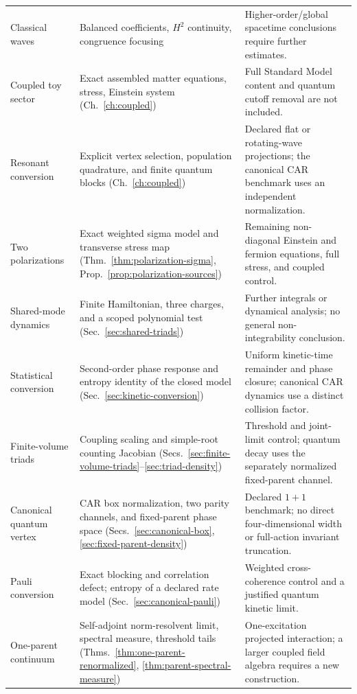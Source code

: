 \documentclass[11pt,a4paper,oneside]{book}
\theoremstyle{plain}
\theoremstyle{definition}
\theoremstyle{remark}
\begin{document}
\begin{longtable}{@{}>{\raggedright\arraybackslash}p{}>{\raggedright\arraybackslash}p{}>{\raggedright\arraybackslash}p{}@{}}
Classical waves & Balanced coefficients, $H^2$ continuity, congruence focusing & Higher-order/global spacetime conclusions require further estimates.\\[1pt]
Coupled toy sector & Exact assembled matter equations, stress, Einstein system (Ch.~\ref{ch:coupled}) & Full Standard Model content and quantum cutoff removal are not included.\\[1pt]
Resonant conversion & Explicit vertex selection, population quadrature, and finite quantum blocks (Ch.~\ref{ch:coupled}) & Declared flat or rotating-wave projections; the canonical CAR benchmark uses an independent normalization.\\[1pt]
Two polarizations & Exact weighted sigma model and transverse stress map (Thm.~\ref{thm:polarization-sigma}, Prop.~\ref{prop:polarization-sources}) & Remaining non-diagonal Einstein and fermion equations, full stress, and coupled control.\\[1pt]
Shared-mode dynamics & Finite Hamiltonian, three charges, and a scoped polynomial test (Sec.~\ref{sec:shared-triads}) & Further integrals or dynamical analysis; no general non-integrability conclusion.\\[1pt]
Statistical conversion & Second-order phase response and entropy identity of the closed model (Sec.~\ref{sec:kinetic-conversion}) & Uniform kinetic-time remainder and phase closure; canonical CAR dynamics use a distinct collision factor.\\[1pt]
Finite-volume triads & Coupling scaling and simple-root counting Jacobian (Secs.~\ref{sec:finite-volume-triads}--\ref{sec:triad-density}) & Threshold and joint-limit control; quantum decay uses the separately normalized fixed-parent channel.\\[1pt]
Canonical quantum vertex & CAR box normalization, two parity channels, and fixed-parent phase space (Secs.~\ref{sec:canonical-box}, \ref{sec:fixed-parent-density}) & Declared $1+1$ benchmark; no direct four-dimensional width or full-action invariant truncation.\\[1pt]
Pauli conversion & Exact blocking and correlation defect; entropy of a declared rate model (Sec.~\ref{sec:canonical-pauli}) & Weighted cross-coherence control and a justified quantum kinetic limit.\\[1pt]
One-parent continuum & Self-adjoint norm-resolvent limit, spectral measure, threshold tails (Thms.~\ref{thm:one-parent-renormalized}, \ref{thm:parent-spectral-measure}) & One-excitation projected interaction; a larger coupled field algebra requires a new construction.\\[1pt]

\end{longtable}
\end{document}
